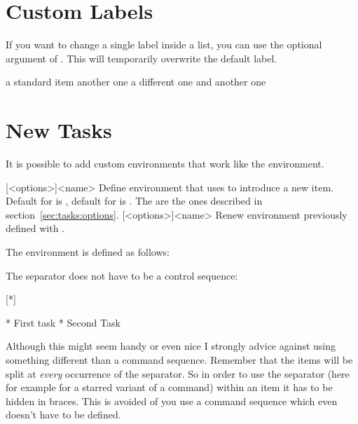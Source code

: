 \documentclass[DIV9,toc=index,toc=bib,numbers=noendperiod]{cnpkgdoc}
\begin{document}
\section{Custom Labels}
If you want to change a single label inside a list, you can use the optional
argument of . This will temporarily overwrite the default label.
\begin{beispiel}
 \begin{tasks}[style=itemize]
  \task a standard item
  \task another one
  \task[+] a different one
  \task and another one
 \end{tasks}
\end{beispiel}

\section{New Tasks}
It is possible to add custom environments that work like the 
environment.
\begin{beschreibung}
 [<options>]{<name>}\newline
   Define environment  that uses  to introduce a
   new item.  Default for  is , default for
    is .  The  are the ones described in
   section~\ref{sec:tasks:options}.
 [<options>]{<name>}\newline
   Renew environment previously defined with .
\end{beschreibung}
The  environment is defined as follows:
\begin{beispiel}
\end{beispiel}

The separator does not have to be a control sequence:
\begin{beispiel}
 [*]
 \begin{done}
  * First task
  * Second Task
 \end{done}
\end{beispiel}
Although this might seem handy or even nice I strongly advice against using
something different than a command sequence. Remember that the items will be
split at \emph{every} occurrence of the separator.  So in order to use the
separator (here for example for a starred variant of a command) within an item
it has to be hidden in braces.  This is avoided of you use a command sequence
which even doesn't have to be defined.
\end{document}
